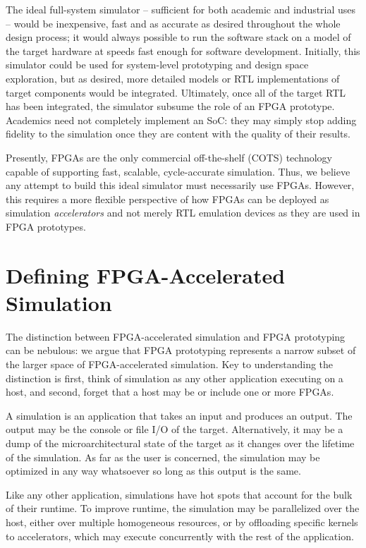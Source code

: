 The ideal full-system simulator -- sufficient for both academic and industrial
uses -- would be inexpensive, fast and as accurate as desired throughout the
whole design process; it would always possible to run the software stack on a
model of the target hardware at speeds fast enough for software development.
Initially, this simulator could be used for system-level prototyping and design
space exploration, but as desired, more detailed models or RTL implementations
of target components would be integrated. Ultimately, once all of the target
RTL has been integrated, the simulator subsume the role of an FPGA prototype.
Academics need not completely implement an SoC: they may simply stop adding
fidelity to the simulation once they are content with the quality of their
results.

Presently, FPGAs are the only commercial off-the-shelf (COTS) technology
capable of supporting fast, scalable, cycle-accurate simulation. Thus, we
believe any attempt to build this ideal simulator must necessarily use FPGAs.
However, this requires a more flexible perspective of how FPGAs can be deployed as
simulation \emph{accelerators} and not merely RTL emulation devices as they are
used in FPGA prototypes.

\section{Defining FPGA-Accelerated Simulation}

The distinction between FPGA-accelerated simulation and FPGA prototyping can be
nebulous: we argue that FPGA prototyping represents a narrow subset of the larger
space of FPGA-accelerated simulation. Key to understanding the distinction is
first, think of simulation as any other application executing on a host, and
second, forget that a host may be or include one or more FPGAs.

A simulation is an application that takes an input and produces an output.  The
output may be the console or file I/O of the target.  Alternatively, it may be
a dump of the microarchitectural state of the target as it changes over the
lifetime of the simulation.  As far as the user is concerned, the simulation
may be optimized in any way whatsoever so long as this output is the same.

Like any other application, simulations have hot spots that account for the bulk
of their runtime. To improve runtime, the simulation may be parallelized over
the host, either over multiple homogeneous resources, or by offloading specific
kernels to accelerators, which may execute concurrently with the rest
of the application.

